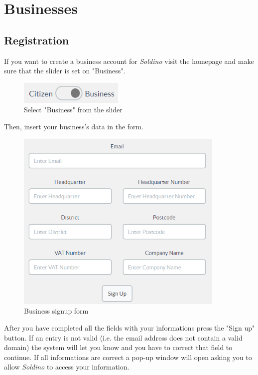 \section{Businesses}
	\subsection{Registration}
	If you want to create a business account for \textit{Soldino} 
	visit the homepage and make sure that the slider is set on "Business".\\
	\begin{figure}[H]
		\includegraphics[width=5cm]{res/images/user_business.png}
		\centering
		\caption{Select "Business" from the slider}
	\end{figure}	
	\noindent Then, insert your business's data in the form.
	\begin{figure}[H]
		\includegraphics[width=10cm]{res/images/business_signup.png}
		\centering
		\caption{Business signup form}
	\end{figure}
	\noindent After you have completed 
	all the	fields with your informations press the "Sign up" button. If an 
	entry is not valid (i.e. the email address does not contain a valid 
	domain) the system will let you know and you have to correct that field 
	to continue. If all informations are correct a pop-up window will open 
	asking you to allow \textit{Soldino} to access your information.\\
